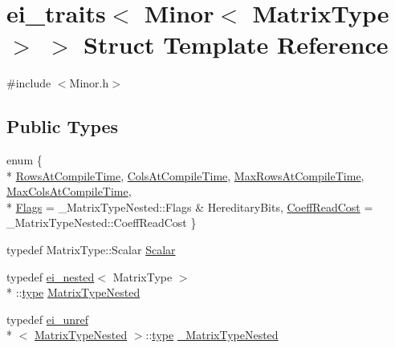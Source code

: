 \hypertarget{structei__traits_3_01_minor_3_01_matrix_type_01_4_01_4}{\section{ei\-\_\-traits$<$ Minor$<$ Matrix\-Type $>$ $>$ Struct Template Reference}
\label{structei__traits_3_01_minor_3_01_matrix_type_01_4_01_4}
}


{\ttfamily \#include $<$Minor.\-h$>$}

\subsection*{Public Types}
\begin{DoxyCompactItemize}
\item 
enum \{ \\*
\hyperlink{structei__traits_3_01_minor_3_01_matrix_type_01_4_01_4_a0271b426b5f81cc5f941161518881039acef6164ba7d76a6019ce599603671fad}{Rows\-At\-Compile\-Time}, 
\hyperlink{structei__traits_3_01_minor_3_01_matrix_type_01_4_01_4_a0271b426b5f81cc5f941161518881039a26fd88dc185eba7d1502403091340e26}{Cols\-At\-Compile\-Time}, 
\hyperlink{structei__traits_3_01_minor_3_01_matrix_type_01_4_01_4_a0271b426b5f81cc5f941161518881039a8295277b3152f66a976f766611941000}{Max\-Rows\-At\-Compile\-Time}, 
\hyperlink{structei__traits_3_01_minor_3_01_matrix_type_01_4_01_4_a0271b426b5f81cc5f941161518881039a00d2d64fc025fcb1989206b332163f79}{Max\-Cols\-At\-Compile\-Time}, 
\\*
\hyperlink{structei__traits_3_01_minor_3_01_matrix_type_01_4_01_4_a0271b426b5f81cc5f941161518881039a75a437ce9935a4ca743b98e34a9d1ce4}{Flags} = \-\_\-\-Matrix\-Type\-Nested\-:\-:Flags \& Hereditary\-Bits, 
\hyperlink{structei__traits_3_01_minor_3_01_matrix_type_01_4_01_4_a0271b426b5f81cc5f941161518881039a4830cf4adb898d258ccd4883bfde69bc}{Coeff\-Read\-Cost} = \-\_\-\-Matrix\-Type\-Nested\-:\-:Coeff\-Read\-Cost
 \}
\item 
typedef Matrix\-Type\-::\-Scalar \hyperlink{structei__traits_3_01_minor_3_01_matrix_type_01_4_01_4_a0bf79498130c326b9c0765ac1938517a}{Scalar}
\item 
typedef \hyperlink{structei__nested}{ei\-\_\-nested}$<$ Matrix\-Type $>$\\*
\-::\hyperlink{glext_8h_a7d05960f4f1c1b11f3177dc963a45d86}{type} \hyperlink{structei__traits_3_01_minor_3_01_matrix_type_01_4_01_4_a9498bfb1b9a4e4ba9d00f93ffb825756}{Matrix\-Type\-Nested}
\item 
typedef \hyperlink{structei__unref}{ei\-\_\-unref}\\*
$<$ \hyperlink{structei__traits_3_01_minor_3_01_matrix_type_01_4_01_4_a9498bfb1b9a4e4ba9d00f93ffb825756}{Matrix\-Type\-Nested} $>$\-::\hyperlink{glext_8h_a7d05960f4f1c1b11f3177dc963a45d86}{type} \hyperlink{structei__traits_3_01_minor_3_01_matrix_type_01_4_01_4_abccddd6924fd4956137510a2c6a543bd}{\-\_\-\-Matrix\-Type\-Nested}
\end{DoxyCompactItemize}


